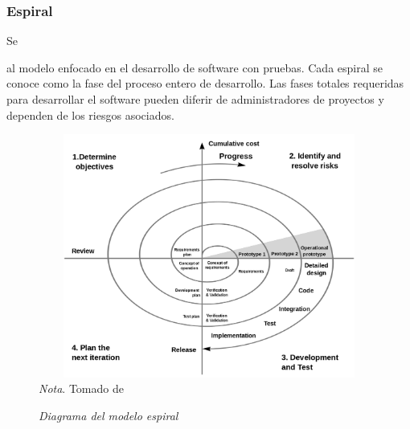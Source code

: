 \documentclass[stu, 12pt, letterpaper, donotrepeattitle, floatsintext, natbib]{apa7}
\begin{document}
\subsubsection{Espiral}
Se \begin{justifying}
    al modelo enfocado en el desarrollo de software con pruebas. Cada espiral se conoce como la fase del proceso entero de desarrollo. Las fases totales requeridas para desarrollar el software
    pueden diferir de administradores de proyectos y dependen de los riesgos asociados.\par
\end{justifying}
\begin{figure}[H]
    \caption{\emph{Diagrama del modelo espiral\\}}
    \centering
    \smallskip
    \includegraphics[width=12cm, height=8cm]{spiral.png}
    \bigskip
    \justifying\small\textit{Nota}. Tomado de \cite{wikipedia-contributors-2022}%
\end{figure}
\vspace{\baselineskip}
\end{document}
